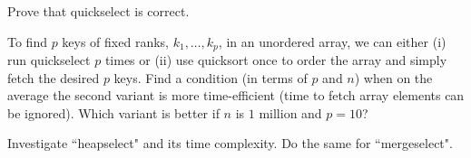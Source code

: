 \begin{Exercise}\label{exr:quickselect-correctness}
Prove that quickselect is correct.
\end{Exercise}

\begin{Exercise}\label{exr:select:ranks}
To find \(p\) keys of fixed ranks, \(k_1 , \ldots, k_p \),
in an unordered array, we can either (i) run quickselect \(p\)
times or (ii) use quicksort once to order the array and simply
fetch the desired \(p\) keys. Find a condition (in terms of
\(p\) and \(n\)) when on the average the second variant is more
time-efficient (time to fetch array elements can be ignored). 
Which variant is better if $n$ is $1$ million and \(p=10\)?
\end{Exercise}

\begin{Exercise}\label{ex:heapselect}
Investigate ``heapselect" and its time complexity. Do the same for 
``mergeselect".
\end{Exercise}
